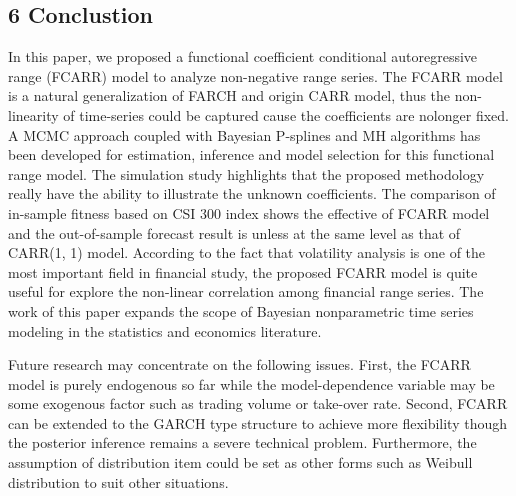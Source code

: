 \documentclass[
journal=jacsat, %
manuscript=article]{achemso}
\begin{document}
\begin{CJK*}{UTF8}{song}
\section{6 Conclustion}
In this paper, we proposed a functional coefficient conditional autoregressive range (FCARR) model to analyze non-negative range series. The FCARR model is a natural generalization of FARCH and origin CARR model, thus the non-linearity of time-series could be captured cause the coefficients are nolonger fixed. A MCMC approach coupled with Bayesian P-splines and MH algorithms has been developed for estimation, inference and model selection for this functional range model. The simulation study highlights that the proposed methodology really have the ability to illustrate the unknown coefficients. The comparison of in-sample fitness based on CSI 300 index shows the effective of FCARR model and the out-of-sample forecast result is unless at the same level as that of CARR(1, 1) model. According to the fact that volatility analysis is one of the most important field in financial study, the proposed FCARR model is quite useful for explore the non-linear correlation among financial range series. The work of this paper expands the scope of Bayesian nonparametric time series modeling in the statistics and economics literature.

Future research may concentrate on the following issues. First, the FCARR model is purely endogenous so far while the model-dependence variable may be some exogenous factor such as trading volume or take-over rate. Second, FCARR can be extended to the GARCH type structure to achieve more flexibility though the posterior inference remains a severe technical problem. Furthermore, the assumption of distribution item could be set as other forms such as Weibull distribution to suit other situations. 


\end{CJK*}
\end{document}
